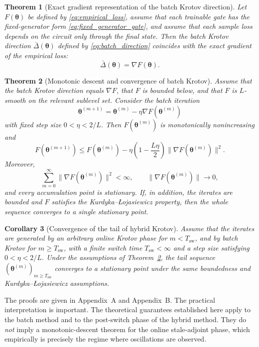 \documentclass[aps,prb,10pt,twocolumn,superscriptaddress]{revtex4-2}
\newtheorem{theorem}{Theorem}
\newtheorem{corollary}[theorem]{Corollary}
\begin{document}
\begin{theorem}[Exact gradient representation of the batch Krotov direction]
\label{thm:exact_gradient_krotov_main}
Let \(F(\bm{\theta})\) be defined by \eqref{eq:empirical_loss}, assume that each trainable gate has the fixed-generator form \eqref{eq:fixed_generator_gate}, and assume that each sample loss depends on the circuit only through the final state. Then the batch Krotov direction \(\bar{\Delta}(\bm{\theta})\) defined by \eqref{eq:batch_direction} coincides with the exact gradient of the empirical loss:
\[
\bar{\Delta}(\bm{\theta})=\nabla F(\bm{\theta}).
\]
\end{theorem}

\begin{theorem}[Monotonic descent and convergence of batch Krotov]
\label{thm:batch_krotov_convergence_main}
Assume that the batch Krotov direction equals \(\nabla F\), that \(F\) is bounded below, and that \(F\) is \(L\)-smooth on the relevant sublevel set. Consider the batch iteration
\[
\bm{\theta}^{(m+1)}=\bm{\theta}^{(m)}-\eta \nabla F(\bm{\theta}^{(m)})
\]
with fixed step size \(0<\eta<2/L\). Then \(F(\bm{\theta}^{(m)})\) is monotonically nonincreasing and
\[
F(\bm{\theta}^{(m+1)})
\leq
F(\bm{\theta}^{(m)})
-\eta\left(1-\frac{L\eta}{2}\right)\|\nabla F(\bm{\theta}^{(m)})\|^2.
\]
Moreover,
\[
\sum_{m=0}^{\infty}\|\nabla F(\bm{\theta}^{(m)})\|^2<\infty,
\qquad
\|\nabla F(\bm{\theta}^{(m)})\|\to 0,
\]
and every accumulation point is stationary. If, in addition, the iterates are bounded and \(F\) satisfies the Kurdyka--\L{}ojasiewicz property, then the whole sequence converges to a single stationary point.
\end{theorem}

\begin{corollary}[Convergence of the tail of hybrid Krotov]
\label{cor:hybrid_tail_main}
Assume that the iterates are generated by an arbitrary online Krotov phase for \(m<T_{\mathrm{sw}}\), and by batch Krotov for \(m\geq T_{\mathrm{sw}}\), with a finite switch time \(T_{\mathrm{sw}}<\infty\) and a step size satisfying \(0<\eta<2/L\). Under the assumptions of Theorem~\ref{thm:batch_krotov_convergence_main}, the tail sequence \((\bm{\theta}^{(m)})_{m\geq T_{\mathrm{sw}}}\) converges to a stationary point under the same boundedness and Kurdyka--\L{}ojasiewicz assumptions.
\end{corollary}

The proofs are given in Appendix~A and Appendix~B. The practical interpretation is important. The theoretical guarantees established here apply to the batch method and to the post-switch phase of the hybrid method. They do \emph{not} imply a monotonic-descent theorem for the online stale-adjoint phase, which empirically is precisely the regime where oscillations are observed.
\end{document}
